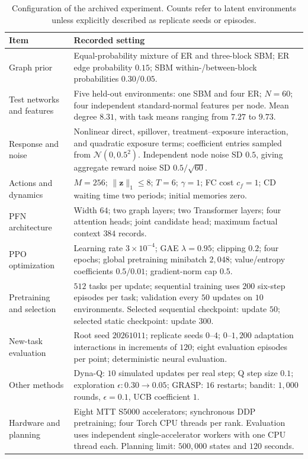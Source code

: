 \documentclass[a4paper,11pt]{article}
\numberwithin{equation}{section}
\begin{document}
\begin{table}[htbp]
\centering\small
\caption{Configuration of the archived experiment. Counts refer to latent environments unless explicitly described as replicate seeds or episodes.}
\label{tab:configuration}
\begin{tabularx}{\textwidth}{@{}p{}L@{}}
\toprule Item & Recorded setting\\\midrule
Graph prior & Equal-probability mixture of ER and three-block SBM; ER edge probability $0.15$; SBM within-/between-block probabilities $0.30/0.05$.\\
Test networks and features & Five held-out environments: one SBM and four ER; $N=60$; four independent standard-normal features per node. Mean degree $8.31$, with task means ranging from $7.27$ to $9.73$.\\
Response and noise & Nonlinear direct, spillover, treatment--exposure interaction, and quadratic exposure terms; coefficient entries sampled from $\mathcal N(0,0.5^2)$. Independent node noise SD $0.5$, giving aggregate reward noise SD $0.5/\sqrt{60}$.\\
Actions and dynamics & $M=256$; $\|\mathbf z\|_1\leq8$; $T=6$; $\gamma=1$; FC cost $c_f=1$; CD waiting time two periods; initial memories zero.\\
PFN architecture & Width $64$; two graph layers; two Transformer layers; four attention heads; joint candidate head; maximum factual context $384$ records.\\
PPO optimization & Learning rate $3\times10^{-4}$; GAE $\lambda=0.95$; clipping $0.2$; four epochs; global pretraining minibatch $2{,}048$; value/entropy coefficients $0.5/0.01$; gradient-norm cap $0.5$.\\
Pretraining and selection & $512$ tasks per update; sequential training uses $200$ six-step episodes per task; validation every $50$ updates on $10$ environments. Selected sequential checkpoint: update $50$; selected static checkpoint: update $300$.\\
New-task evaluation & Root seed $20261011$; replicate seeds $0$--$4$; $0$--$1{,}200$ adaptation interactions in increments of $120$; eight evaluation episodes per point; deterministic neural evaluation.\\
Other methods & Dyna-Q: $10$ simulated updates per real step; Q step size $0.1$; exploration $\epsilon:0.30\rightarrow0.05$; GRASP: $16$ restarts; bandit: $1{,}000$ rounds, $\epsilon=0.1$, UCB coefficient $1$.\\
Hardware and planning & Eight MTT S5000 accelerators; synchronous DDP pretraining; four Torch CPU threads per rank. Evaluation uses independent single-accelerator workers with one CPU thread each. Planning limit: $500{,}000$ states and $120$ seconds.\\
\bottomrule
\end{tabularx}
\end{table}
\end{document}

